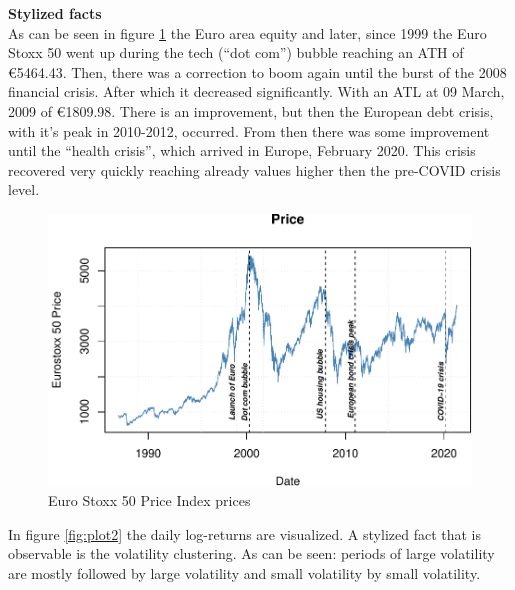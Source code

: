 \documentclass[a4paper, twoside]{templates/ociamthesis}
\begin{document}
\textbf{Stylized facts}~\\
\noindent As can be seen in figure \ref{fig:plot1} the Euro area equity and later, since 1999 the Euro Stoxx 50 went up during the tech (``dot com'') bubble reaching an ATH of €5464.43. Then, there was a correction to boom again until the burst of the 2008 financial crisis. After which it decreased significantly. With an ATL at 09 March, 2009 of €1809.98. There is an improvement, but then the European debt crisis, with it's peak in 2010-2012, occurred. From then there was some improvement until the ``health crisis'', which arrived in Europe, February 2020. This crisis recovered very quickly reaching already values higher then the pre-COVID crisis level.

\begin{figure}[h]

{\centering \includegraphics[width=1\linewidth]{_main_files/figure-latex/plot1-1} 

}

\caption{Euro Stoxx 50 Price Index prices}\label{fig:plot1}
\end{figure}

\newpage

\noindent In figure \ref{fig:plot2} the daily log-returns are visualized. A stylized fact that is observable is the volatility clustering. As can be seen: periods of large volatility are mostly followed by large volatility and small volatility by small volatility.
\end{document}
